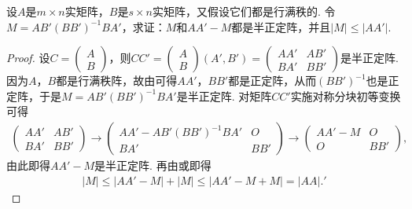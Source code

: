 \documentclass[../../main.tex]{subfiles}%
\begin{document}
\begin{example}\label{example:例9.81}
设\(A\)是\(m\times n\)实矩阵，\(B\)是\(s\times n\)实矩阵，又假设它们都是行满秩的. 令\(M = AB'(BB')^{-1}BA'\)，求证：\(M\)和\(AA' - M\)都是半正定阵，并且\(\vert M\vert\leqslant \vert AA'\vert\).
\end{example}
\begin{proof}

设\(C=\begin{pmatrix}A\\B\end{pmatrix}\)，则\(CC'=\begin{pmatrix}A\\B\end{pmatrix}(A',B')=\begin{pmatrix}AA'&AB'\\BA'&BB'\end{pmatrix}\)是半正定阵. 因为\(A\)，\(B\)都是行满秩阵，故由可得\(AA'\)，\(BB'\)都是正定阵，从而\((BB')^{-1}\)也是正定阵，于是\(M = AB'(BB')^{-1}BA'\)是半正定阵. 对矩阵\(CC'\)实施对称分块初等变换可得
\begin{align*}
\begin{pmatrix}AA'&AB'\\BA'&BB'\end{pmatrix}\to\begin{pmatrix}AA' - AB'(BB')^{-1}BA'&O\\BA'&BB'\end{pmatrix}\to\begin{pmatrix}AA' - M&O\\O&BB'\end{pmatrix},
\end{align*}
由此即得\(AA' - M\)是半正定阵. 再由或即得
\begin{align*}
\left| M \right|\leqslant \left| AA' -M \right|+\left| M \right|\leqslant \left| AA'-M+M \right|=\left| AA\right|.
'\end{align*}

\end{proof}
\end{document}
